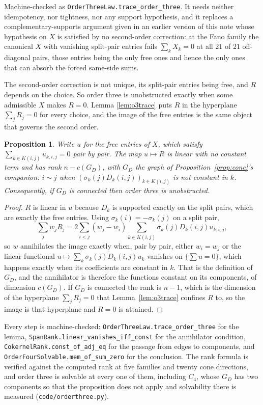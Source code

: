 \documentclass[11pt]{article}
\newtheorem{proposition}[theorem]{Proposition}
\theoremstyle{remark}
\begin{document}
Machine-checked as \texttt{OrderThreeLaw.trace\_order\_three}. It needs neither idempotency, nor
tightness, nor any support hypothesis, and it replaces a complementary-supports argument given in an
earlier version of this note whose hypothesis on $X$ is satisfied by no second-order correction: at
the Fano family the canonical $X$ with vanishing split-pair entries fails $\sum_kX_k=0$ at all $21$
of $21$ off-diagonal pairs, those entries being the only free ones and hence the only ones that can
absorb the forced same-side sums.

The second-order correction is not unique, its split-pair entries being free, and $R$ depends on the
choice. So order three is unobstructed exactly when some admissible $X$ makes $R=0$. Lemma
\ref{lem:o3trace} puts $R$ in the hyperplane $\sum_jR_j=0$ for every choice, and the image of the
free entries is the same object that governs the second order.

\begin{proposition}\label{prop:o3rank}
Write $u$ for the free entries of $X$, which satisfy $\sum_{k\in K(i,j)}u_{k,i,j}=0$ pair by pair.
The map $u\mapsto R$ is linear with no constant term and has rank $n-c(G_D)$, with $G_D$ the graph of
Proposition~\ref{prop:cone}'s companion: $i\sim j$ when $(\sigma_k(j)D_k(i,j))_{k\in K(i,j)}$ is not
constant in $k$. Consequently, if $G_D$ is connected then order three is unobstructed.
\end{proposition}

\begin{proof}
$R$ is linear in $u$ because $D_k$ is supported exactly on the split pairs, which are exactly the
free entries. Using $\sigma_k(i)=-\sigma_k(j)$ on a split pair,
\[
\sum_jw_jR_j=2\sum_{i<j}(w_j-w_i)\!\!\sum_{k\in K(i,j)}\!\!\sigma_k(j)D_k(i,j)u_{k,i,j},
\]
so $w$ annihilates the image exactly when, pair by pair, either $w_i=w_j$ or the linear functional
$u\mapsto\sum_k\sigma_k(j)D_k(i,j)u_k$ vanishes on $\{\sum u=0\}$, which happens exactly when its
coefficients are constant in $k$. That is the definition of $G_D$, and the annihilator is therefore
the functions constant on its components, of dimension $c(G_D)$. If $G_D$ is connected the rank is
$n-1$, which is the dimension of the hyperplane $\sum_jR_j=0$ that Lemma~\ref{lem:o3trace} confines
$R$ to, so the image is that hyperplane and $R=0$ is attained.
\end{proof}

Every step is machine-checked: \texttt{OrderThreeLaw.trace\_order\_three} for the lemma,
\texttt{SpanRank.linear\_vanishes\_iff\_const} for the annihilator condition,
\texttt{CokernelRank.const\_of\_adj\_eq} for the passage from edges to components, and
\texttt{OrderFourSolvable.mem\_of\_sum\_zero} for the conclusion. The rank formula is verified
against the computed rank at five families and twenty cone directions, and order three is solvable at
every one of them, including $C_4$, whose $G_D$ has two components so that the proposition does not
apply and solvability there is measured (\texttt{code/orderthree.py}).
\end{document}
